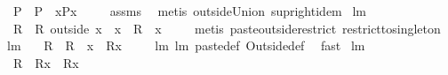 \begin{isabellebody}
\ \ {\isachardoublequoteopen}P\ {\isacharequal}\ P\ {\isasymunion}\ {\isacharbraceleft}x{\isacharbraceright}{\isasymtimes}P{\isacharbackquote}{\isacharbackquote}{\isacharbraceleft}x{\isacharbraceright}{\isachardoublequoteclose}\ \isanewline
%
\isadelimproof
\ \ %
\endisadelimproof
%
\isatagproof
{}\isamarkupfalse%
\ assms\ \isamarkupfalse%
\ {\isacharparenleft}metis\ outsideUnion\ sup{\isachardot}right{\isacharunderscore}idem{\isacharparenright}%
\endisatagproof
{\isafoldproof}%
%
\isadelimproof
\isanewline
%
\endisadelimproof
\isanewline
{}\isamarkupfalse%
\ lm{}{}{}{\isacharcolon}\ \isanewline
\ \ {\isachardoublequoteopen}R\ {\isacharequal}\ {\isacharparenleft}R\ outside\ {\isacharbraceleft}x{\isacharbraceright}{\isacharparenright}\ {\isacharplus}{\isacharasterisk}\ {\isacharparenleft}{\isacharbraceleft}x{\isacharbraceright}\ {\isasymtimes}\ {\isacharparenleft}R\ {\isacharbackquote}{\isacharbackquote}\ {\isacharbraceleft}x{\isacharbraceright}{\isacharparenright}{\isacharparenright}{\isachardoublequoteclose}\ \isanewline
%
\isadelimproof
\ \ %
\endisadelimproof
%
\isatagproof
{}\isamarkupfalse%
\ {\isacharparenleft}metis\ paste{\isacharunderscore}outside{\isacharunderscore}restrict\ restrict{\isacharunderscore}to{\isacharunderscore}singleton{\isacharparenright}%
\endisatagproof
{\isafoldproof}%
%
\isadelimproof
\isanewline
%
\endisadelimproof
\isanewline
{}\isamarkupfalse%
\ lm{}{}{}{\isacharcolon}\ \isanewline
\ \ {\isachardoublequoteopen}R\ {\isasymsubseteq}\ R\ {\isacharplus}{\isacharasterisk}\ {\isacharparenleft}{\isacharbraceleft}x{\isacharbraceright}\ {\isasymtimes}\ {\isacharparenleft}R{\isacharbackquote}{\isacharbackquote}{\isacharbraceleft}x{\isacharbraceright}{\isacharparenright}{\isacharparenright}{\isachardoublequoteclose}\ \isanewline
%
\isadelimproof
\ \ %
\endisadelimproof
%
\isatagproof
{}\isamarkupfalse%
\ lm{}{}{}\ lm{}{}{}\ paste{\isacharunderscore}def\ Outside{\isacharunderscore}def\ \isamarkupfalse%
\ fast%
\endisatagproof
{\isafoldproof}%
%
\isadelimproof
\isanewline
%
\endisadelimproof
\isanewline
{}\isamarkupfalse%
\ lm{}{}{}{\isacharcolon}\ \isanewline
\ \ {\isachardoublequoteopen}R\ {\isasymsupseteq}\ R{\isacharplus}{\isacharasterisk}{\isacharparenleft}{\isacharbraceleft}x{\isacharbraceright}\ {\isasymtimes}\ {\isacharparenleft}R{\isacharbackquote}{\isacharbackquote}{\isacharbraceleft}x{\isacharbraceright}{\isacharparenright}{\isacharparenright}{\isachardoublequoteclose}\ \isanewline

\end{isabellebody}

